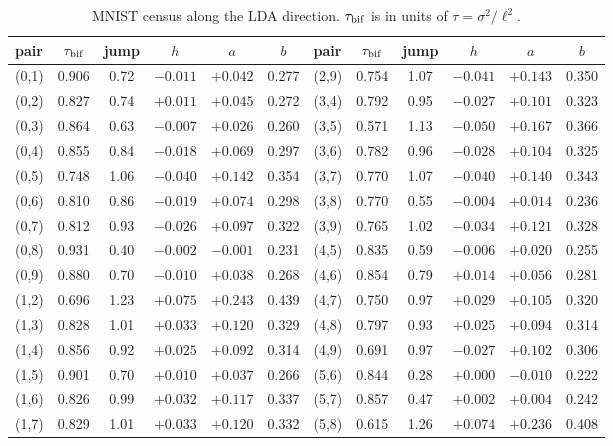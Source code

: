 \begin{table}[h]
\caption{MNIST census along the LDA direction. $\tau_{\rm bif}$ is in units of $\tau=\sigma^2/\ell^2$.}
\label{tab:mnist}
\begin{center}
\scriptsize\setlength{\tabcolsep}{3pt}
\begin{tabular}{lccccc|lccccc}
\toprule
pair & $\tau_{\rm bif}$ & jump & $h$ & $a$ & $b$ & pair & $\tau_{\rm bif}$ & jump & $h$ & $a$ & $b$ \\
\midrule
(0,1) & 0.906 & 0.72 & $-0.011$ & $+0.042$ & 0.277  & (2,9) & 0.754 & 1.07 & $-0.041$ & $+0.143$ & 0.350  \\
(0,2) & 0.827 & 0.74 & $+0.011$ & $+0.045$ & 0.272  & (3,4) & 0.792 & 0.95 & $-0.027$ & $+0.101$ & 0.323  \\
(0,3) & 0.864 & 0.63 & $-0.007$ & $+0.026$ & 0.260  & (3,5) & 0.571 & 1.13 & $-0.050$ & $+0.167$ & 0.366  \\
(0,4) & 0.855 & 0.84 & $-0.018$ & $+0.069$ & 0.297  & (3,6) & 0.782 & 0.96 & $-0.028$ & $+0.104$ & 0.325  \\
(0,5) & 0.748 & 1.06 & $-0.040$ & $+0.142$ & 0.354  & (3,7) & 0.770 & 1.07 & $-0.040$ & $+0.140$ & 0.343  \\
(0,6) & 0.810 & 0.86 & $-0.019$ & $+0.074$ & 0.298  & (3,8) & 0.770 & 0.55 & $-0.004$ & $+0.014$ & 0.236  \\
(0,7) & 0.812 & 0.93 & $-0.026$ & $+0.097$ & 0.322  & (3,9) & 0.765 & 1.02 & $-0.034$ & $+0.121$ & 0.328  \\
(0,8) & 0.931 & 0.40 & $-0.002$ & $-0.001$ & 0.231  & (4,5) & 0.835 & 0.59 & $-0.006$ & $+0.020$ & 0.255  \\
(0,9) & 0.880 & 0.70 & $-0.010$ & $+0.038$ & 0.268  & (4,6) & 0.854 & 0.79 & $+0.014$ & $+0.056$ & 0.281  \\
(1,2) & 0.696 & 1.23 & $+0.075$ & $+0.243$ & 0.439  & (4,7) & 0.750 & 0.97 & $+0.029$ & $+0.105$ & 0.320  \\
(1,3) & 0.828 & 1.01 & $+0.033$ & $+0.120$ & 0.329  & (4,8) & 0.797 & 0.93 & $+0.025$ & $+0.094$ & 0.314  \\
(1,4) & 0.856 & 0.92 & $+0.025$ & $+0.092$ & 0.314  & (4,9) & 0.691 & 0.97 & $-0.027$ & $+0.102$ & 0.306  \\
(1,5) & 0.901 & 0.70 & $+0.010$ & $+0.037$ & 0.266  & (5,6) & 0.844 & 0.28 & $+0.000$ & $-0.010$ & 0.222  \\
(1,6) & 0.826 & 0.99 & $+0.032$ & $+0.117$ & 0.337  & (5,7) & 0.857 & 0.47 & $+0.002$ & $+0.004$ & 0.242  \\
(1,7) & 0.829 & 1.01 & $+0.033$ & $+0.120$ & 0.332  & (5,8) & 0.615 & 1.26 & $+0.074$ & $+0.236$ & 0.408  \\

\end{tabular}
\end{center}
\end{table}
